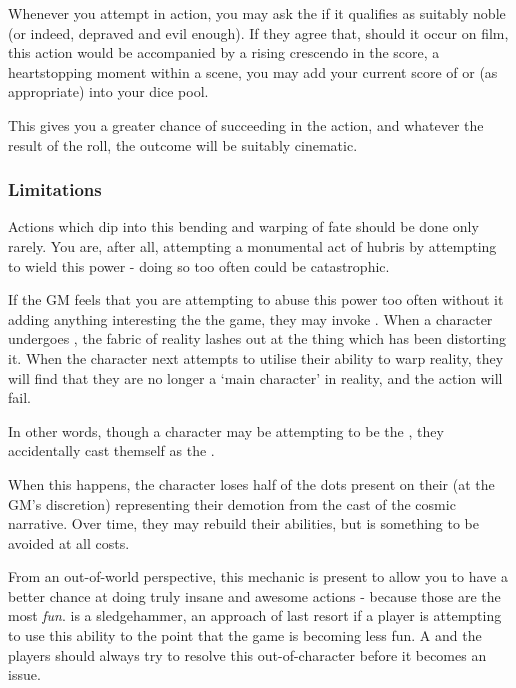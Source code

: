 Whenever you attempt in action, you may ask the  if it qualifies as suitably noble (or indeed, depraved and evil enough). If they agree that, should it occur on film, this action would be accompanied by a rising crescendo in the score, a heartstopping moment within a scene, you may add your current score of  or  (as appropriate) into your dice pool. 

This gives you a greater chance of succeeding in the action, and whatever the result of the roll, the outcome will be suitably cinematic. 

\subsubsection{Limitations}

Actions which dip into this bending and warping of fate should be done only rarely. You are, after all, attempting a monumental act of hubris by attempting to wield this power - doing so too often could be catastrophic. 

If the GM feels that you are attempting to abuse this power too often without it adding anything interesting the the game, they may invoke . When a character undergoes , the fabric of reality lashes out at the thing which has been distorting it. When the character next attempts to utilise their ability to warp reality, they will find that they are no longer a `main character' in reality, and the action will fail. 

In other words, though a character may be attempting to be the , they accidentally cast themself as the .

When this happens, the character loses half of the dots present on their  (at the GM's discretion) representing their demotion from the cast of the cosmic narrative. Over time, they may rebuild their abilities, but  is something to be avoided at all costs.

From an out-of-world perspective, this mechanic is present to allow you to have a better chance at doing truly insane and awesome actions - because those are the most {\it fun}.  is a sledgehammer, an approach of last resort if a player is attempting to use this ability to the point that the game is becoming less fun. A  and the players should always try to resolve this out-of-character before it becomes an issue. 

